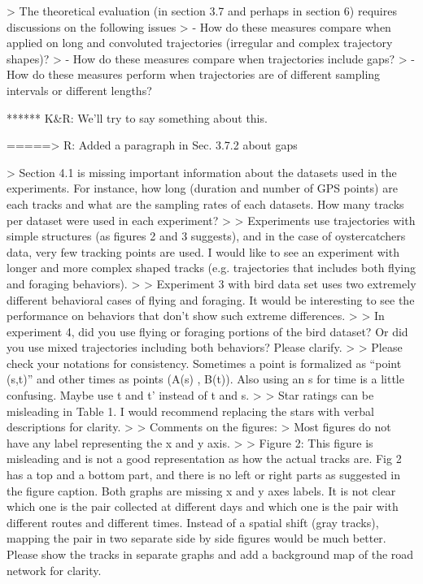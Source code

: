 > The theoretical evaluation (in section 3.7 and perhaps in section 6) requires discussions on the following issues
> - How do these measures compare when applied on long and convoluted trajectories (irregular and complex trajectory shapes)?
> - How do these measures compare when trajectories include gaps?
> - How do these measures perform when trajectories are of different sampling intervals or different lengths?

****** K&R: We'll try to say something about this.

=====> R: Added a paragraph in Sec. 3.7.2 about gaps

> Section 4.1 is missing important information about the datasets used in the experiments. For instance, how long (duration and number of GPS points) are each tracks and what are the sampling rates of each datasets. How many tracks per dataset were used in each experiment?
>
> Experiments use trajectories with simple structures (as figures 2 and 3 suggests), and in the case of oystercatchers data, very few tracking points are used. I would like to see an experiment with longer and more complex shaped tracks (e.g. trajectories that includes both flying and foraging behaviors).
>
> Experiment 3 with bird data set uses two extremely different behavioral cases of flying and foraging. It would be interesting to see the performance on behaviors that don’t show such extreme differences.
>
> In experiment 4, did you use flying or foraging portions of the bird dataset? Or did you use mixed trajectories including both behaviors? Please clarify.
>
> Please check your notations for consistency. Sometimes a point is formalized as “point (s,t)” and other times as points (A(s) , B(t)). Also using an s for time is a little confusing. Maybe use t and t’ instead of t and s.
>
> Star ratings can be misleading in Table 1. I would recommend replacing the stars with verbal descriptions for clarity.
>
> Comments on the figures:
> Most figures do not have any label representing the x and y axis.
>
> Figure 2: This figure is misleading and is not a good representation as how the actual tracks are. Fig 2 has a top and a bottom part, and there is no left or right parts as suggested in the figure caption. Both graphs are missing x and y axes labels. It is not clear which one is the pair collected at different days and which one is the pair with different routes and different times. Instead of a spatial shift (gray tracks), mapping the pair in two separate side by side figures would be much better. Please show the tracks in separate graphs and add a background map of the road network for clarity.
